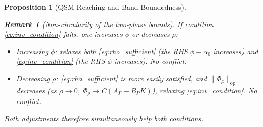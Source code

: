 \documentclass[10pt]{amsart}
\numberwithin{equation}{section}
\newtheorem{proposition}[theorem]{Proposition}
\newtheorem{remark}[theorem]{Remark}
\begin{document}
\begin{proposition}[QSM Reaching and Band Boundedness]
\begin{remark}[Non-circularity of the two-phase bounds]
If condition \eqref{eq:inv_condition} fails, one increases $\phi$ or decreases $\rho$:
\begin{itemize}
  \item \emph{Increasing $\phi$}: relaxes both \eqref{eq:rho_sufficient} (the RHS
        $\phi-\alpha_0$ increases) and \eqref{eq:inv_condition} (the RHS $\phi$
        increases). No conflict.
  \item \emph{Decreasing $\rho$}: \eqref{eq:rho_sufficient} is more easily satisfied,
        and $\|\Phi_\rho\|_{\mathrm{op}}$ decreases (as $\rho\to 0$,
        $\Phi_\rho\to C(A_P-B_PK)$), relaxing \eqref{eq:inv_condition}. No conflict.
\end{itemize}
Both adjustments therefore simultaneously help both conditions.
\end{remark}
\end{proposition}
\end{document}
